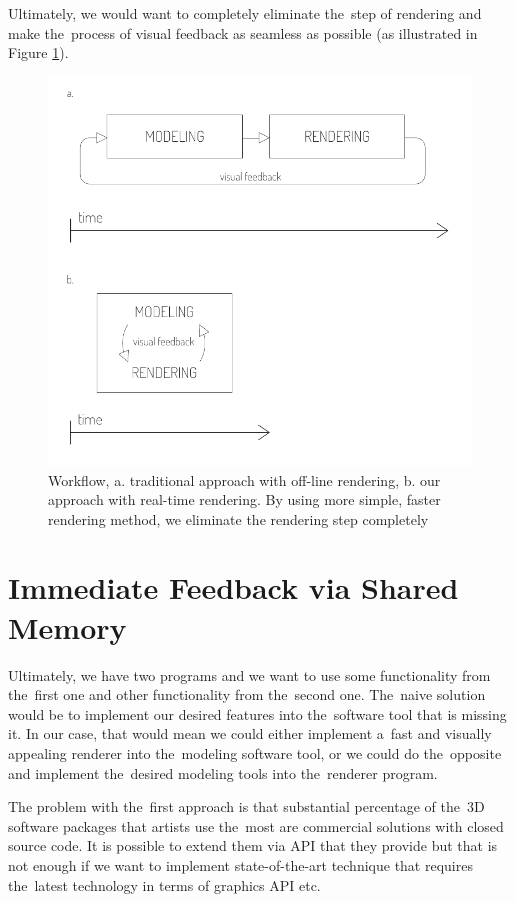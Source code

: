 \documentclass[
  digital, %
  table,   %
  nolof,     %
  nolot,     %
  oneside,
]{fithesis3}
\begin{document}
Ultimately, we would want to completely eliminate the step of rendering and make the process of visual feedback as seamless as possible (as illustrated in Figure \ref{fig:workflow-before-after}).

\begin{figure}
  \centering
  \includegraphics[scale=1.0]{images/workflow-smaller.pdf}
  \caption{Workflow, a. traditional approach with off-line rendering, b. our approach with real-time rendering. By using more simple, faster rendering method, we eliminate the rendering step completely}
  \label{fig:workflow-before-after}
\end{figure}

\section{Immediate Feedback via Shared Memory}
Ultimately, we have two programs and we want to use some functionality from the first one and other functionality from the second one. The naive solution would be to implement our desired features into the software tool that is missing it. In our case, that would mean we could either implement a fast and visually appealing renderer into the modeling software tool, or we could do the opposite and implement the desired modeling tools into the renderer program.

The problem with the first approach is that substantial percentage of the 3D software packages that artists use the most are commercial solutions with closed source code. It is possible to extend them via API that they provide but that is not enough if we want to implement state-of-the-art technique that requires the latest technology in terms of graphics API etc.
\end{document}
